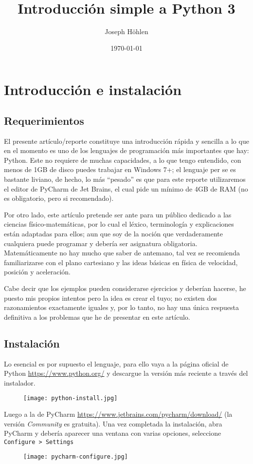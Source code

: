\documentclass[11pt,twoside]{report}
\title{Introducción simple a Python 3}
\author{Joseph Höhlen}
\date\today
\begin{document}
\maketitle

\chapter*{Introducción e instalación}
\section*{Requerimientos}
El presente artículo/reporte constituye una introducción rápida y sencilla a lo que en el momento es uno de los lenguajes de programación más importantes que hay: Python. Este no requiere de muchas capacidades, a lo que tengo entendido, con menos de 1GB de disco puedes trabajar en Windows 7+; el lenguaje per se es bastante liviano, de hecho, lo más ``pesado'' es que para este reporte utilizaremos el editor de PyCharm de Jet Brains, el cual pide un mínimo de 4GB de RAM (no es obligatorio, pero si recomendado).

Por otro lado, este artículo pretende ser ante para un público dedicado a las ciencias físico-matemáticas, por lo cual el léxico, terminología y explicaciones están adaptadas para ellos; aun que soy de la noción que verdaderamente cualquiera puede programar y debería ser asignatura obligatoria. Matemáticamente no hay mucho que saber de antemano, tal vez se recomienda familiarizarse con el plano cartesiano y las ideas básicas en física de velocidad, posición y aceleración.

Cabe decir que los ejemplos pueden considerarse ejercicios y deberían hacerse, he puesto mis propios intentos pero la idea es crear el tuyo; no existen dos razonamientos exactamente iguales y, por lo tanto, no hay una única respuesta definitiva a los problemas que he de presentar en este artículo.

\section*{Instalación}
Lo esencial es por supuesto el lenguaje, para ello vaya a la página oficial de Python \url{https://www.python.org/} y descargue la versión más reciente a través del instalador.
\begin{figure}
\centering
\texttt{[image: python-install.jpg]}
\caption{}
\end{figure}

Luego a la de PyCharm \url{https://www.jetbrains.com/pycharm/download/} (la versión \textit{Community} es gratuita). Una vez completada la instalación, abra PyCharm y debería aparecer una ventana con varias opciones, seleccione \texttt{Configure > Settings}
\begin{figure}
\centering
\texttt{[image: pycharm-configure.jpg]}
\caption{}
\end{figure}
\end{document}

